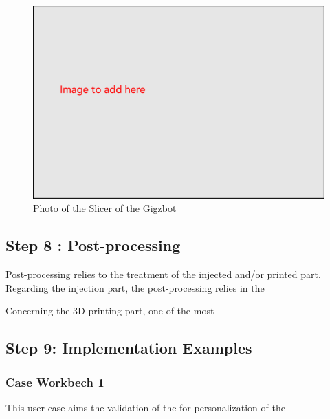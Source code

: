 \documentclass[
  11pt,
]{article}
\begin{document}
\begin{figure}[H]

{\centering \includegraphics[width=5.20833in,height=\textheight]{figures/Image-to-add.png}

}

\caption{Photo of the Slicer of the Gigzbot}

\end{figure}

\hypertarget{step-8-post-processing}{%
\subsection{Step 8 : Post-processing}\label{step-8-post-processing}}

Post-processing relies to the treatment of the injected and/or printed
part. Regarding the injection part, the post-processing relies in the

Concerning the 3D printing part, one of the most

\hypertarget{step-9-implementation-examples}{%
\subsection{Step 9: Implementation
Examples}\label{step-9-implementation-examples}}

\hypertarget{case-workbech-1}{%
\subsubsection{Case Workbech 1}\label{case-workbech-1}}

This user case aims the validation of the for personalization of the
\end{document}
